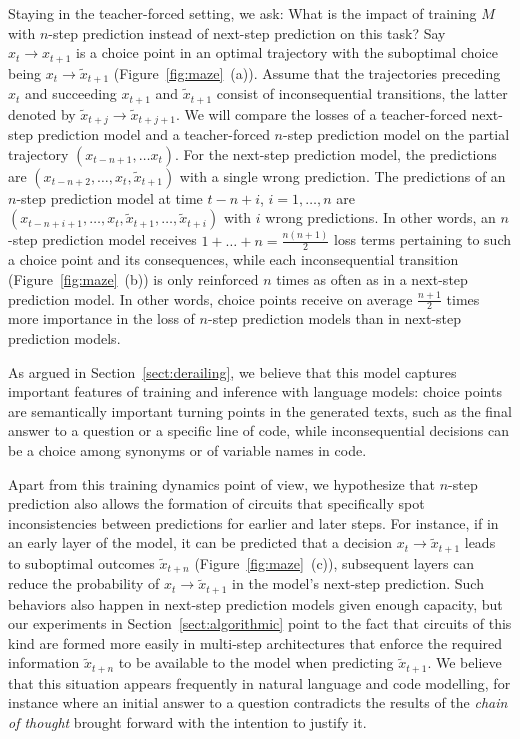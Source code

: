 Staying in the teacher-forced setting, we ask: What is the impact of training $M$ with $n$-step prediction instead of next-step prediction on this task? Say $x_t \to x_{t+1}$ is a choice point in an optimal trajectory with the suboptimal choice being $x_t \to \tilde{x}_{t+1}$ (Figure~\ref{fig:maze}~(a)). Assume that the trajectories preceding $x_t$ and succeeding $x_{t+1}$ and $\tilde{x}_{t+1}$ consist of inconsequential transitions, the latter denoted by $\tilde{x}_{t+j} \to \tilde{x}_{t+j+1}$. We will compare the losses of a teacher-forced next-step prediction model and a teacher-forced $n$-step prediction model on the partial trajectory $(x_{t-n+1}, \ldots x_t)$. For the next-step prediction model, the predictions are $(x_{t-n+2}, \ldots, x_t, \tilde{x}_{t+1})$ with a single wrong prediction. The predictions of an $n$-step prediction model at time $t - n + i$, $i = 1, \ldots, n$ are $(x_{t-n+i+1}, \ldots, x_t, \tilde{x}_{t+1}, \ldots, \tilde{x}_{t+i})$ with $i$ wrong predictions. In other words, an $n$-step prediction model receives $1 + \ldots + n = \frac{n(n+1)}{2}$ loss terms pertaining to such a choice point and its consequences, while each inconsequential transition (Figure~\ref{fig:maze}~(b)) is only reinforced $n$ times as often as in a next-step prediction model. In other words, choice points receive on average $\frac{n+1}{2}$ times more importance in the loss of $n$-step prediction models than in next-step prediction models.

As argued in Section~\ref{sect:derailing}, we believe that this model captures important features of training and inference with language models: choice points are semantically important turning points in the generated texts, such as the final answer to a question or a specific line of code, while inconsequential decisions can be a choice among synonyms or of variable names in code.

Apart from this training dynamics point of view, we hypothesize that $n$-step prediction also allows the formation of circuits that specifically spot inconsistencies between predictions for earlier and later steps. For instance, if in an early layer of the model, it can be predicted that a decision $x_t \to \tilde{x}_{t+1}$ leads to suboptimal outcomes $\tilde{x}_{t+n}$ (Figure~\ref{fig:maze}~(c)), subsequent layers can reduce the probability of $x_t \to \tilde{x}_{t+1}$ in the model's next-step prediction. Such behaviors also happen in next-step prediction models given enough capacity, but our experiments in Section~\ref{sect:algorithmic} point to the fact that circuits of this kind are formed more easily in multi-step architectures that enforce the required information $\tilde{x}_{t+n}$ to be available to the model when predicting $\tilde{x}_{t+1}$. We believe that this situation appears frequently in natural language and code modelling, for instance where an initial answer to a question contradicts the results of the \emph{chain of thought} brought forward with the intention to justify it.


